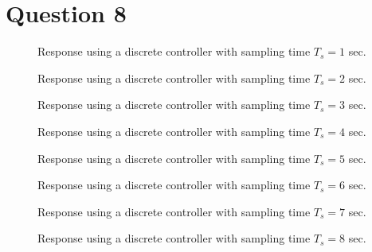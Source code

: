 \section{Question 8}

\begin{figure}[H]\centering
	\centering
	\scalebox{1}{}
  \caption{Response using a discrete controller with sampling time $T_s = 1$ sec.}
  \label{fig:Q8.1}
\end{figure}

\begin{figure}[H]\centering
	\centering
	\scalebox{1}{}
  \caption{Response using a discrete controller with sampling time $T_s = 2$ sec.}
  \label{fig:Q8.2}
\end{figure}

\begin{figure}[H]\centering
	\centering
	\scalebox{1}{}
  \caption{Response using a discrete controller with sampling time $T_s = 3$ sec.}
  \label{fig:Q8.3}
\end{figure}

\begin{figure}[H]\centering
	\centering
	\scalebox{1}{}
  \caption{Response using a discrete controller with sampling time $T_s = 4$ sec.}
  \label{fig:Q8.4}
\end{figure}

\begin{figure}[H]\centering
	\centering
	\scalebox{1}{}
  \caption{Response using a discrete controller with sampling time $T_s = 5$ sec.}
  \label{fig:Q8.5}
\end{figure}

\begin{figure}[H]\centering
	\centering
	\scalebox{1}{}
  \caption{Response using a discrete controller with sampling time $T_s = 6$ sec.}
  \label{fig:Q8.6}
\end{figure}

\begin{figure}[H]\centering
	\centering
	\scalebox{1}{}
  \caption{Response using a discrete controller with sampling time $T_s = 7$ sec.}
  \label{fig:Q8.7}
\end{figure}

\begin{figure}[H]\centering
	\centering
	\scalebox{1}{}
  \caption{Response using a discrete controller with sampling time $T_s = 8$ sec.}
  \label{fig:Q8.8}
\end{figure}
